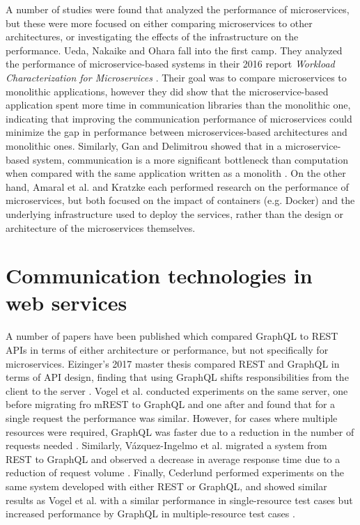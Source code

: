 A number of studies were found that analyzed the performance of microservices, but these were more focused on either comparing microservices to other architectures, or investigating the effects of the infrastructure on the performance. Ueda, Nakaike and Ohara fall into the first camp. They analyzed the performance of microservice-based systems in their 2016 report \textit{Workload Characterization for Microservices} \cite{ueda2016workload}. Their goal was to compare microservices to monolithic applications, however they did show that the microservice-based application spent more time in communication libraries than the monolithic one, indicating that improving the communication performance of microservices could minimize the gap in performance between microservices-based architectures and monolithic ones. Similarly, Gan and Delimitrou showed that in a microservice-based system, communication is a more significant bottleneck than computation when compared with the same application written as a monolith \cite{gan2018architectural}. On the other hand, Amaral et al. \cite{amaral2015performance} and Kratzke \cite{kratzke2017microservices} each performed research on the performance of microservices, but both focused on the impact of containers (e.g. Docker) and the underlying infrastructure used to deploy the services, rather than the design or architecture of the microservices themselves.

\section{Communication technologies in web services}
A number of papers have been published which compared GraphQL to REST APIs in terms of either architecture or performance, but not specifically for microservices. Eizinger's 2017 master thesis compared REST and GraphQL in terms of API design, finding that using GraphQL shifts responsibilities from the client to the server \cite{eizinger2017api}. Vogel et al. conducted experiments on the same server, one before migrating fro mREST to GraphQL and one after and found that for a single request the performance was similar. However, for cases where multiple resources were required, GraphQL was faster due to a reduction in the number of requests needed \cite{vogel2017experiences}. Similarly, Vázquez-Ingelmo et al. migrated a system from REST to GraphQL and observed a decrease in average response time due to a reduction of request volume \cite{vazquez2017improving}. Finally, Cederlund performed experiments on the same system developed with either REST or GraphQL, and showed similar results as Vogel et al. with a similar performance in single-resource test cases but increased performance by GraphQL in multiple-resource test cases \cite{cederlund2016performance}.

